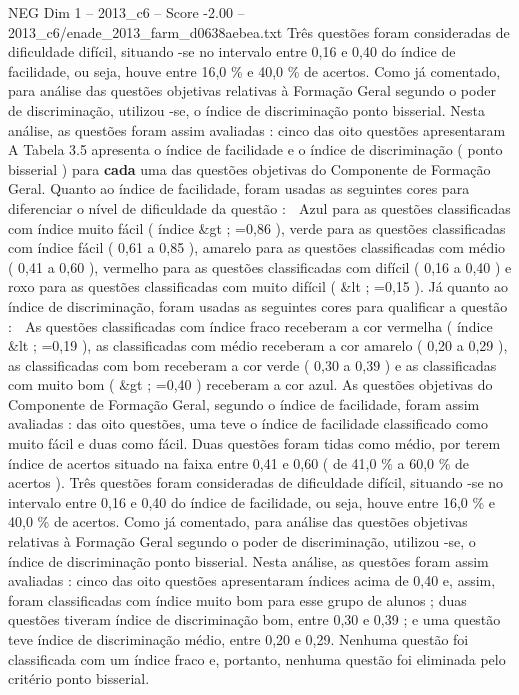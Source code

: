 \begin{textsample}{NEG Dim 1 – 2013\_c6 – Score -2.00 – 2013\_c6/enade\_2013\_farm\_d0638aebea.txt}
Três questões foram consideradas de dificuldade difícil, situando -se no intervalo entre 0,16 e 0,40 do índice de facilidade, ou seja, houve entre 16,0 \% e 40,0 \% de acertos.
Como já comentado, para análise das questões objetivas relativas à Formação Geral segundo o poder de discriminação, utilizou -se, o índice de discriminação ponto bisserial.
Nesta análise, as questões foram assim avaliadas : cinco das oito questões apresentaram A Tabela 3.5 apresenta o índice de facilidade e o índice de discriminação ( ponto bisserial ) para \textbf{cada} uma das questões objetivas do Componente de Formação Geral.
Quanto ao índice de facilidade, foram usadas as seguintes cores para diferenciar o nível de dificuldade da questão :  Azul para as questões classificadas com índice muito fácil ( índice \&gt ; =0,86 ), verde para as questões classificadas com índice fácil ( 0,61 a 0,85 ), amarelo para as questões classificadas com médio ( 0,41 a 0,60 ), vermelho para as questões classificadas com difícil ( 0,16 a 0,40 ) e roxo para as questões classificadas com muito difícil ( \&lt ; =0,15 ).
Já quanto ao índice de discriminação, foram usadas as seguintes cores para qualificar a questão :  As questões classificadas com índice fraco receberam a cor vermelha ( índice \&lt ; =0,19 ), as classificadas com médio receberam a cor amarelo ( 0,20 a 0,29 ), as classificadas com bom receberam a cor verde ( 0,30 a 0,39 ) e as classificadas com muito bom ( \&gt ; =0,40 ) receberam a cor azul.
As questões objetivas do Componente de Formação Geral, segundo o índice de facilidade, foram assim avaliadas : das oito questões, uma teve o índice de facilidade classificado como muito fácil e duas como fácil.
Duas questões foram tidas como médio, por terem índice de acertos situado na faixa entre 0,41 e 0,60 ( de 41,0 \% a 60,0 \% de acertos ).
Três questões foram consideradas de dificuldade difícil, situando -se no intervalo entre 0,16 e 0,40 do índice de facilidade, ou seja, houve entre 16,0 \% e 40,0 \% de acertos.
Como já comentado, para análise das questões objetivas relativas à Formação Geral segundo o poder de discriminação, utilizou -se, o índice de discriminação ponto bisserial.
Nesta análise, as questões foram assim avaliadas : cinco das oito questões apresentaram índices acima de 0,40 e, assim, foram classificadas com índice muito bom para esse grupo de alunos ; duas questões tiveram índice de discriminação bom, entre 0,30 e 0,39 ; e uma questão teve índice de discriminação médio, entre 0,20 e 0,29.
Nenhuma questão foi classificada com um índice fraco e, portanto, nenhuma questão foi eliminada pelo critério ponto bisserial.

\end{textsample}
